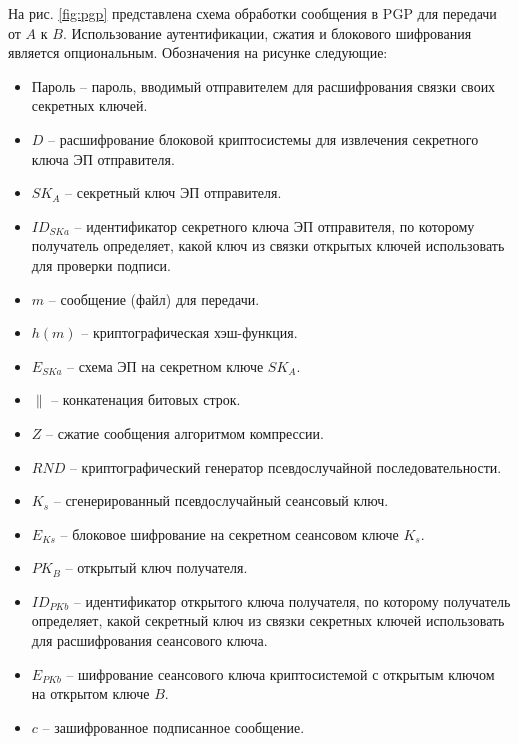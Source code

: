 На рис. \ref{fig:pgp} представлена схема обработки сообщения в PGP для передачи от $A$ к $B$. Использование аутентификации, сжатия и блокового шифрования является опциональным. Обозначения на рисунке следующие:
\begin{itemize}
    \item Пароль -- пароль, вводимый отправителем для расшифрования связки своих секретных ключей.
    \item $D$ -- расшифрование блоковой криптосистемы для извлечения секретного ключа ЭП отправителя.
    \item $SK_A$ -- секретный ключ ЭП отправителя.
    \item $ID_{SKa}$ -- идентификатор секретного ключа ЭП отправителя, по которому получатель определяет, какой ключ из связки открытых ключей использовать для проверки подписи.
    \item $m$ -- сообщение (файл) для передачи.
    \item $h(m)$ -- криптографическая хэш-функция.
    \item $E_{SKa}$ -- схема ЭП на секретном ключе $SK_A$.
    \item $\|$ -- конкатенация битовых строк.
    \item $Z$ -- сжатие сообщения алгоритмом компрессии.
    \item $RND$ -- криптографический генератор псевдослучайной последовательности.
    \item $K_s$ -- сгенерированный псевдослучайный сеансовый ключ.
    \item $E_{Ks}$ -- блоковое шифрование на секретном сеансовом ключе $K_s$.
    \item $PK_B$ -- открытый ключ получателя.
    \item $ID_{PKb}$ -- идентификатор открытого ключа получателя, по которому получатель определяет, какой секретный ключ из связки секретных ключей использовать для расшифрования сеансового ключа.
    \item $E_{PKb}$ -- шифрование сеансового ключа криптосистемой с открытым ключом на открытом ключе $B$.
    \item $c$ -- зашифрованное подписанное сообщение.
\end{itemize}
